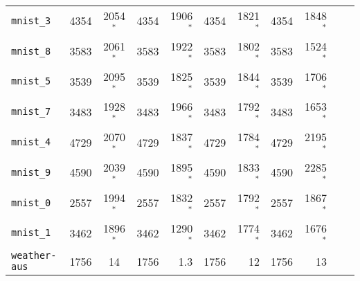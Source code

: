 \begin{tabular}{lccrrrrrrrr}
\texttt{mnist\_3} & 4354 & 2054$^*$ & 4354 & 1906$^*$ & 4354 & 1821$^*$ & 4354 & 1848$^*$\\
\texttt{mnist\_8} & 3583 & 2061$^*$ & 3583 & 1922$^*$ & 3583 & 1802$^*$ & 3583 & 1524$^*$\\
\texttt{mnist\_5} & 3539 & 2095$^*$ & 3539 & 1825$^*$ & 3539 & 1844$^*$ & 3539 & 1706$^*$\\
\texttt{mnist\_7} & 3483 & 1928$^*$ & 3483 & 1966$^*$ & 3483 & 1792$^*$ & 3483 & 1653$^*$\\
\texttt{mnist\_4} & 4729 & 2070$^*$ & 4729 & 1837$^*$ & 4729 & 1784$^*$ & 4729 & 2195$^*$\\
\texttt{mnist\_9} & 4590 & 2039$^*$ & 4590 & 1895$^*$ & 4590 & 1833$^*$ & 4590 & 2285$^*$\\
\texttt{mnist\_0} & 2557 & 1994$^*$ & 2557 & 1832$^*$ & 2557 & 1792$^*$ & 2557 & 1867$^*$\\
\texttt{mnist\_1} & 3462 & 1896$^*$ & 3462 & 1290$^*$ & 3462 & 1774$^*$ & 3462 & 1676$^*$\\
\texttt{weather-aus} & 1756 & 14 & 1756 & 1.3 & 1756 & 12 & 1756 & 13\\
\bottomrule
\end{tabular}
